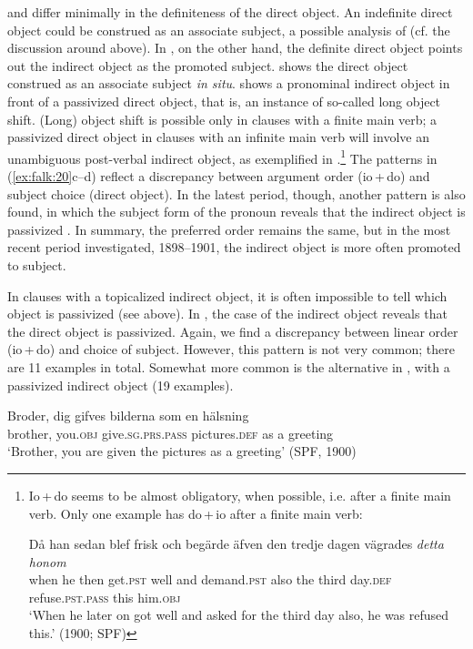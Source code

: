 \documentclass[output=paper]{langscibook}
\begin{document}
 and  differ minimally in the definiteness of the direct object. An indefinite direct object could be construed as an associate subject, a possible analysis of  (cf. the discussion around  above). In , on the other hand, the definite direct object points out the indirect object as the promoted subject.  shows the direct object construed as an associate subject \textit{in situ}.  shows a pronominal indirect object in front of a passivized direct object, that is, an instance of so-called long object shift. (Long) object shift is possible only in clauses with a finite main verb; a passivized direct object in clauses with an infinite main verb will involve an unambiguous post-verbal indirect object, as exemplified in .\footnote{Io\,+\,do seems to be almost obligatory, when possible, i.e. after a finite main verb. Only one example has do\,+\,io after a finite main verb:

\ea \gll Då    han  sedan  blef    frisk  och  begärde    äfven  den  tredje  dagen  vägrades \textit{detta}  \textit{honom}\\
         when  he    then  get.\textsc{pst}  well  and  demand.\textsc{pst}  also    the  third  day.\textsc{def}  refuse\textsc{.pst.pass}  this  him.\textsc{obj}\\
         \glt ‘When he later on got well and asked for the third day also, he was refused this.’ (1900; SPF)
\z} The patterns in (\ref{ex:falk:20}c–d) reflect a discrepancy between argument order (io\,+\,do) and subject choice (direct object). In the latest period, though, another pattern is also found, in which the subject form of the pronoun reveals that the indirect object is passivized . In summary, the preferred order remains the same, but in the most recent period investigated, 1898–1901, the indirect object is more often promoted to subject.


In clauses with a topicalized indirect object, it is often impossible to tell which object is passivized (see  above). In , the case of the indirect object reveals that the direct object is passivized. Again, we find a discrepancy between linear order (io\,+\,do) and choice of subject. However, this pattern is not very common; there are 11 examples in total. Somewhat more common is the alternative in , with a passivized indirect object (19 examples).


\ea%
    \label{ex:falk:21}
\ea \label{ex:falk:21a}
\gll Broder,  dig    gifves            bilderna      som  en  hälsning\\
      brother,  you.\textsc{obj}  give.\textsc{sg.prs.pass}  pictures\textsc{.def}  as    a  greeting\\
\glt ‘Brother, you are given the pictures as a greeting’ (SPF, 1900)
\end{document}
